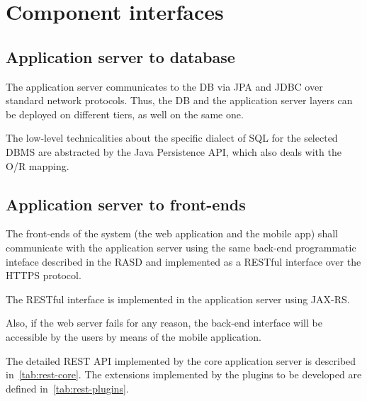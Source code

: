 \section{Component interfaces}
\label{sec:component-interfaces}

\subsection{Application server to database}
The application server communicates to the DB via JPA and JDBC over standard network protocols. Thus, the DB and the application server layers can be deployed on different tiers, as well on the same one.

The low-level technicalities about the specific dialect of SQL for the selected DBMS are abstracted by the Java Persistence API, which also deals with the O/R mapping.

\subsection{Application server to front-ends}
The front-ends of the system (the web application and the mobile app) shall communicate with the application server using the same back-end programmatic inteface described in the RASD and implemented as a RESTful interface over the HTTPS protocol.

The RESTful interface is implemented in the application server using JAX-RS.

Also, if the web server fails for any reason, the back-end interface will be accessible by the users by means of the mobile application.

The detailed REST API implemented by the core application server is described in~\autoref{tab:rest-core}. The extensions implemented by the plugins to be developed are defined in~\autoref{tab:rest-plugins}.

